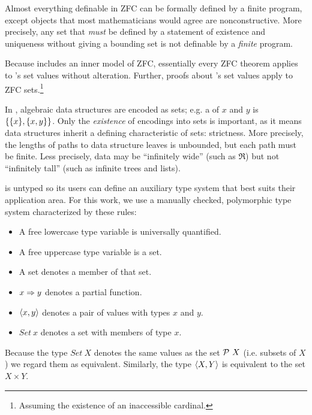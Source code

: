 \documentclass[preprint]{sigplanconf}
\begin{document}
Almost everything definable in ZFC can be formally defined by a finite \lzfclang program, except objects that most mathematicians would agree are nonconstructive.
More precisely, any set that \emph{must} be defined by a statement of existence and uniqueness without giving a bounding set is not definable by a \emph{finite} \lzfclang program.

Because \lzfclang includes an inner model of ZFC, essentially every ZFC theorem applies to \lzfclang's set values without alteration.
Further, proofs about \lzfclang's set values apply to ZFC sets.\footnote{Assuming the existence of an inaccessible cardinal.}

In \lzfclang, algebraic data structures are encoded as sets; e.g. a  of $x$ and $y$ is $\{{\{{x}\},\{{x,y}\}}\}$.
Only the \emph{existence} of encodings into sets is important, as it means data structures inherit a defining characteristic of sets: strictness.
More precisely, the lengths of paths to data structure leaves is unbounded, but each path must be finite.
Less precisely, data may be ``infinitely wide'' (such as $\Re$) but not ``infinitely tall'' (such as infinite trees and lists).


\lzfclang is untyped so its users can define an auxiliary type system that best suits their application area.
For this work, we use a manually checked, polymorphic type system characterized by these rules:
\begin{itemize}
	\item A free lowercase type variable is universally quantified.
	\item A free uppercase type variable is a set.
	\item A set denotes a member of that set.
	\item $x \Rightarrow y$ denotes a partial function.
	\item $\langle{x,y}\rangle$ denotes a pair of values with types $x$ and $y$.
	\item $Set~x$ denotes a set with members of type $x$.
\end{itemize}
Because the type $Set~X$ denotes the same values as the set $\mathcal{P}~X$ (i.e. subsets of $X$) we regard them as equivalent.
Similarly, the type $\langle{X,Y}\rangle$ is equivalent to the set $X \times Y$.
\end{document}
